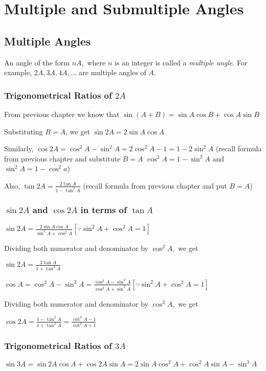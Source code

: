 \chapter{Multiple and Submultiple Angles}
\section{Multiple Angles}
An angle of the form $nA,$ where $n$ is an integer is called a {\it multiple angle}. For example, $2A, 3A, 4A,
\ldots$ are multiple angles of $A.$

\subsection{Trigonometrical Ratios of $2A$}
From previous chapter we know that $\sin(A + B) = \sin A\cos B + \cos A\sin B$

\noindent Substituting $B = A$, we get $\sin 2A = 2\sin A\cos A$

\noindent Similarly, $\cos 2A = \cos^2A - \sin^2A = 2\cos^2A -  1 = 1 - 2\sin^2A$ (recall formula from previous chapter and
substitute $B = A$ $\cos^2A = 1 -\sin^2A$ and $\sin^2A = 1 - \cos^2a$)

\noindent Also, $\tan 2A = \frac{2\tan A}{1 - \tan^2A}$ (recall formula from previous chapter and put $B = A$)

\subsection{$\sin 2A$ and $\cos 2A$ in terms of $\tan A$}
$\sin 2A = \frac{2\sin A\cos A}{\sin^2A + \cos^2A}[\because \sin^2A + \cos^2A = 1]$

\noindent Dividing both numerator and denominator by $\cos^2A,$ we get

\noindent $\sin 2A = \frac{2\tan A}{1 + \tan^2A}$

\noindent $\cos A = \cos^2A - \sin^2A = \frac{\cos^2A - \sin^2A}{\cos^2A + \sin^2A}[\because \sin^2A + \cos^2A = 1]$

\noindent Dividing both numerator and denominator by $\cos^2A,$ we get

\noindent $\cos 2A = \frac{1 - \tan^2A}{1 + \tan^2A} = \frac{\cot^2A - 1}{\cot^2A + 1}$

\subsection{Trigonometrical Ratios of $3A$}
$\sin 3A = \sin2A\cos A + \cos 2A\sin A = 2\sin A\cos^2 A + \cos^2A\sin A - \sin^3A$

